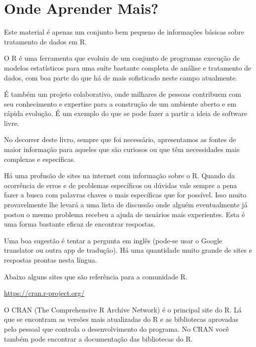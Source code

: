 \documentclass[12pt,a4paper,oneside]{erdc}
\begin{document}


%
%
%


\chapter{Onde Aprender Mais?}

Este material é apenas um conjunto bem pequeno de informações básicas sobre tratamento de dados em R. 

O R é uma ferramenta que evoluiu de um conjunto de programas execução de modelos estatísticos para uma suíte bastante completa de análise e tratamento de dados, com boa parte do que há de mais sofisticado neste campo atualmente.

É também um projeto colaborativo, onde milhares de pessoas contribuem com seu conhecimento e expertise para a construção de um ambiente aberto e em rápida evolução. É um exemplo do que se pode fazer a partir a ideia de software livre.

No decorrer deste livro, sempre que foi necessário, apresentamos as fontes de maior informação para aqueles que são curiosos ou que têm necessidades mais complexas e específicas. 

Há uma profusão de sites na internet com informação sobre o R. Quando da ocorrência de erros e de problemas específicos ou dúvidas vale sempre a pena fazer a busca com palavras chaves o mais específicas que for possível. Isso muito provavelmente lhe levará a uma lista de discussão onde alguém eventualmente já postou o mesmo problema recebeu a ajuda de usuários mais experientes. Esta é uma forma bastante eficaz de encontrar respostas.

Uma boa sugestão é tentar a pergunta em inglês (pode-se usar o Google translator ou outra app de tradução). Há uma quantidade muito grande de sites e respostas prontas nesta língua.

Abaixo alguns sites que são referência para a comunidade R.

\url{https://cran.r-project.org/}

O CRAN (The Comprehensive R Archive Network) é o principal site do R. Lá que se encontram as versões mais atualizadas do R  e as bibliotecas aprovadas pelo pessoal que controla o desenvolvimento do programa. No CRAN você também pode encontrar a documentação das bibliotecas do R.
\end{document}
